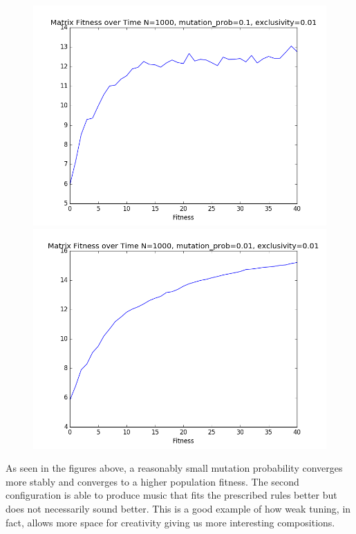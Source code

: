 \documentclass{article}
\begin{document}
\begin{figure}[H]
\centering
\begin{minipage}{.5\textwidth}
  \centering
  \includegraphics[width=1\linewidth]{../graphs/fitness1.png}
\end{minipage}%
\begin{minipage}{.5\textwidth}
  \centering
  \includegraphics[width=1\linewidth]{../graphs/fitness2.png}
\end{minipage}
\end{figure}

As seen in the figures above, a reasonably small mutation probability converges more stably and converges to a higher population fitness. The second configuration is able to produce music that fits the prescribed rules better but does not necessarily sound better. This is a good example of how weak tuning, in fact, allows more space for creativity giving us more interesting compositions.
\end{document}
